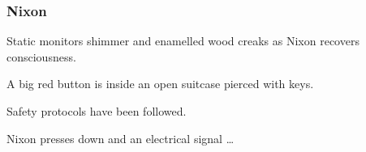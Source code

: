 \documentclass[noamssymb,
graphics,
]{beamer} %
\newcommand{\hozlinedash}[0]{
  \noindent\hdashrule[0.5ex][c]{\textwidth}{.1pt}{2.5pt}
}
\begin{document}
\begin{frame}
  \frametitle{Nixon}

  {\rmfamily
    Static monitors shimmer and enamelled wood creaks as Nixon recovers consciousness.

    A big red button is inside an open suitcase pierced with keys.

    Safety protocols have been followed.

    Nixon presses down and an electrical signal \dots
  }


\end{frame}



\end{document}
